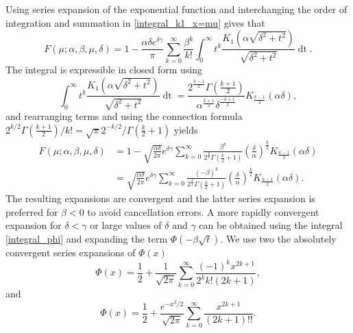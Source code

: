 \documentclass[10pt,a4paper,oneside]{article}
\numberwithin{equation}{section}
\begin{document}
Using series expansion of the exponential function and interchanging the order of integration and summation in \eqref{integral_k1_x=mu} gives that
\begin{equation*}
F(\mu; \alpha, \beta, \mu, \delta) = 1 - \frac{\alpha \delta e^{\delta \gamma}}{\pi} \sum_{k=0}^{\infty}\frac{\beta^k}{k!}\int_{0}^{\infty} t^k \frac{K_1\left(\alpha\sqrt{\delta^2 + t^2}\right)}{\sqrt{\delta^2 + t^2}} \mathop{dt}.
\end{equation*}
The integral is expressible in closed form using \cite[\S 6.596]{gradshteyn2007}
\begin{equation*}
\int_0^{\infty} t^k \frac{K_1\left(\alpha\sqrt{\delta^2 + t^2}\right)}{\sqrt{\delta^2 + t^2}} \mathop{dt} = \frac{2^{\frac{k-1}{2}} \Gamma\left(\frac{k+1}{2}\right)}{\alpha^{\frac{k+1}{2}} \delta^{\frac{-k+1}{2}}}K_{\frac{k-1}{2}}(\alpha\delta),
\end{equation*}
and rearranging terms and using the connection formula $2^{k/2}  \Gamma\left(\frac{k+1}{2}\right)/ k! = \sqrt{\pi} 2^{-k/2} / \Gamma\left(\frac{k}{2} + 1\right)$ yields
\begin{align}
F(\mu; \alpha, \beta, \mu, \delta) &= 1 - \sqrt{\frac{\alpha \delta}{2\pi}}e^{\delta \gamma} \sum_{k=0}^{\infty}\frac{\beta^k}{2^{\frac{k}{2}}\Gamma\left(\frac{k}{2} + 1\right)} \left(\frac{\delta}{\alpha}\right)^{\frac{k}{2}} K_{\frac{k-1}{2}}(\alpha \delta)\\
&=\sqrt{\frac{\alpha \delta}{2\pi}}e^{\delta \gamma} \sum_{k=0}^{\infty}\frac{(-\beta)^k}{2^{\frac{k}{2}}\Gamma\left(\frac{k}{2} + 1\right)} \left(\frac{\delta}{\alpha}\right)^{\frac{k}{2}} K_{\frac{k-1}{2}}(\alpha \delta).
\end{align}
The resulting expansions are convergent and the latter series expansion is preferred for $\beta < 0$ to avoid cancellation errors. A more rapidly convergent expansion for $\delta < \gamma$ or large values of $\delta$ and $\gamma$ can be obtained using the integral \eqref{integral_phi} and expanding the term $\Phi(-\beta\sqrt{t})$. We use two the absolutely convergent series expansions of $\Phi(x)$ \cite[\S 2]{Lebedev1972}
\begin{equation}\label{phi_expansion_1}
\Phi(x) = \frac{1}{2} + \frac{1}{\sqrt{2\pi}}\sum_{k=0}^{\infty} \frac{(-1)^k x^{2k + 1}}{2^k k! (2k+1)},
\end{equation}
and
\begin{equation}\label{phi_expansion_2}
\Phi(x) = \frac{1}{2} + \frac{e^{-x^2 / 2}}{\sqrt{2\pi}}\sum_{k=0}^{\infty} \frac{x^{2k+1}}{(2k + 1)!!}.
\end{equation}
\end{document}

